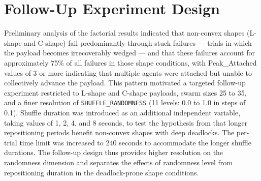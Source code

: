 \section{Follow-Up Experiment Design}
\label{sec:followup}

Preliminary analysis of the factorial results indicated that non-convex shapes (L-shape and C-shape) fail predominantly through stuck failures — trials in which the payload becomes irrecoverably wedged — and that these failures account for approximately 75\% of all failures in those shape conditions, with Peak\_Attached values of 3 or more indicating that multiple agents were attached but unable to collectively advance the payload. This pattern motivated a targeted follow-up experiment restricted to L-shape and C-shape payloads, swarm sizes 25 to 35, and a finer resolution of \texttt{SHUFFLE\_RANDOMNESS} (11 levels: 0.0 to 1.0 in steps of 0.1). Shuffle duration was introduced as an additional independent variable, taking values of 1, 2, 4, and 8 seconds, to test the hypothesis from \citet{springer2022} that longer repositioning periods benefit non-convex shapes with deep deadlocks. The per-trial time limit was increased to 240 seconds to accommodate the longer shuffle durations. The follow-up design thus provides higher resolution on the randomness dimension and separates the effects of randomness level from repositioning duration in the deadlock-prone shape conditions.
